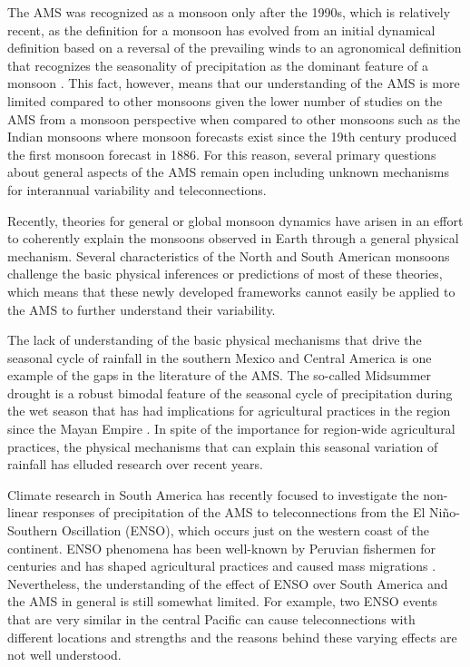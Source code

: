 The AMS was recognized as a monsoon only after the 1990s, which is relatively recent, as the definition for a monsoon has evolved from an initial dynamical definition based on a reversal of the prevailing winds to an agronomical definition that recognizes the seasonality of precipitation as the dominant feature of a monsoon \citep{wang2017,gadgil2018}. This fact, however, means that our understanding of the AMS is more limited compared to other monsoons given the lower number of studies on the AMS from a monsoon perspective when compared to other monsoons such as the Indian monsoons where monsoon forecasts exist since the 19th century \citep{blanford} produced the first monsoon forecast in 1886.    
For this reason, several primary questions about general aspects of the AMS remain open including unknown mechanisms for interannual variability and teleconnections.

Recently, theories for general or global monsoon dynamics have arisen in an effort to coherently explain the monsoons observed in Earth through a general physical mechanism. Several characteristics of the North and South American monsoons challenge the basic physical inferences or predictions of most of these theories, which means that these newly developed frameworks cannot  easily be applied to the AMS to further understand their variability. 


The lack of understanding of the basic physical mechanisms that drive the seasonal cycle of rainfall in the southern Mexico and Central America is one example of the gaps in the literature of the AMS. The so-called Midsummer drought is a robust bimodal feature of the seasonal cycle of precipitation during the wet season that has had implications for agricultural practices in the region since the Mayan Empire \citep{jobbova2018ritual}. In spite of the importance for region-wide agricultural practices, the physical mechanisms that can explain this seasonal variation of rainfall has elluded research over recent years. 

Climate research in South America has recently focused to investigate the non-linear responses of precipitation of the AMS to teleconnections from the El Niño-Southern Oscillation (ENSO), which occurs just on the western coast of the continent. ENSO phenomena has been well-known by Peruvian fishermen for centuries and has shaped agricultural practices and caused mass migrations \citep{caramanica2020nino}. Nevertheless, the understanding of the effect of ENSO over South America and the AMS in general is still somewhat limited. For example, two ENSO events that are very similar in the central Pacific can cause teleconnections with different locations and strengths and the reasons behind these varying effects are not well understood. 

